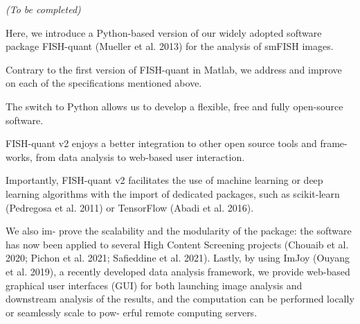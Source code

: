\begin{center}
	\textit{(To be completed)}
\end{center}








Here, we introduce a Python-based version of our widely adopted software package
FISH-quant (Mueller et al. 2013) for the analysis of smFISH images.

Contrary to the first version of FISH-quant in Matlab, we address and improve on each of
the specifications mentioned above.

The switch to Python allows us to develop a flexible, free and fully open-source software.

FISH-quant v2 enjoys a better integration to other open source tools and frame- works, from data analysis to web-based user interaction.

Importantly, FISH-quant v2 facilitates the use of machine learning or deep learning algorithms with the import of dedicated packages, such as scikit-learn (Pedregosa et al. 2011) or TensorFlow (Abadi et al. 2016).

We also im- prove the scalability and the modularity of the package: the software has now been applied to several High Content Screening projects (Chouaib et al. 2020; Pichon et al. 2021; Safieddine et al. 2021). Lastly, by using ImJoy (Ouyang et al. 2019), a recently developed data analysis framework, we provide web-based graphical user
interfaces (GUI) for both launching image analysis and downstream analysis of the
results, and the computation can be performed locally or seamlessly scale to pow- erful remote computing servers.


